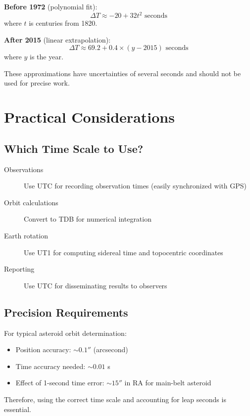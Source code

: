 \textbf{Before 1972} (polynomial fit):
\begin{equation}
\Delta T \approx -20 + 32t^2 \text{ seconds}
\end{equation}
where $t$ is centuries from 1820.

\textbf{After 2015} (linear extrapolation):
\begin{equation}
\Delta T \approx 69.2 + 0.4 \times (y - 2015) \text{ seconds}
\end{equation}
where $y$ is the year.

These approximations have uncertainties of several seconds and should not be used for precise work.

\section{Practical Considerations}

\subsection{Which Time Scale to Use?}

\begin{description}
    \item[Observations] Use UTC for recording observation times (easily synchronized with GPS)
    \item[Orbit calculations] Convert to TDB for numerical integration
    \item[Earth rotation] Use UT1 for computing sidereal time and topocentric coordinates
    \item[Reporting] Use UTC for disseminating results to observers
\end{description}

\subsection{Precision Requirements}

For typical asteroid orbit determination:
\begin{itemize}
    \item Position accuracy: $\sim 0.1''$ (arcsecond)
    \item Time accuracy needed: $\sim 0.01$ s
    \item Effect of 1-second time error: $\sim 15''$ in RA for main-belt asteroid
\end{itemize}

Therefore, using the correct time scale and accounting for leap seconds is essential.


